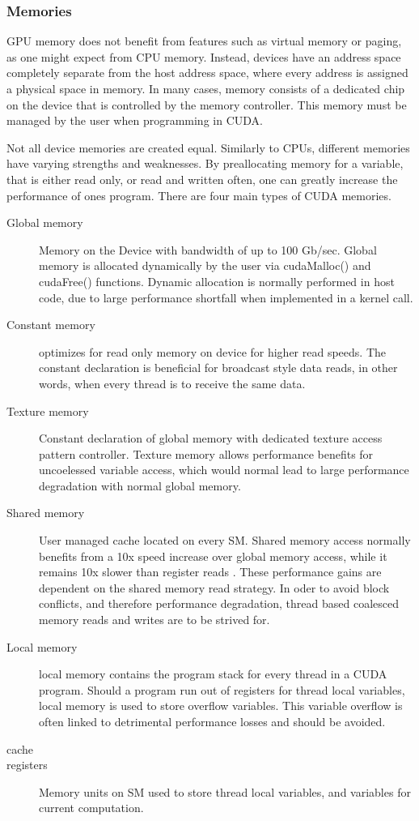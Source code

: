 \subsubsection{Memories}\label{sssec:memories}
GPU memory does not benefit from features such as virtual
memory or paging, as one might expect from CPU memory. Instead, devices have an
address space completely separate from the host address space, where every address is assigned a physical space in memory.
In many cases, memory consists of a dedicated chip on the device that is controlled
by the memory controller.  This memory must be managed by the user when programming in CUDA.
\par
Not all device memories are created equal.  Similarly to \Glspl{CPU},
different memories have varying strengths and weaknesses.  By preallocating memory for a variable,
that is either read only, or read and written often, one can greatly increase the
performance of ones program\cite{Wilt}.   %
There are four main types of CUDA memories.
\begin{description}
  \item [Global memory] Memory on the Device with bandwidth of up to 100 Gb/sec.
  Global memory is allocated dynamically by the user via cudaMalloc() and cudaFree() functions.
  Dynamic allocation is normally performed in host code, due to large performance shortfall
  when implemented in a kernel call.
  \item [Constant memory] optimizes for read only memory on device for higher
  read speeds.  The constant declaration is beneficial for broadcast style data
  reads, in other words, when every thread is to receive the same data.
  \item [Texture memory] Constant declaration of global memory with dedicated
   texture access pattern controller.  Texture memory allows performance benefits
   for uncoelessed variable access, which would normal lead to large performance
   degradation with normal global memory.
  \item [Shared memory] User managed cache located on every \Gls{SM}.  Shared memory access
  normally benefits from a 10x speed increase over global memory access, while it remains
  10x slower than register reads \cite{Wilt}.  These performance gains are dependent
  on the shared memory read strategy.  In oder to avoid block conflicts, and therefore
  performance degradation, thread based coalesced memory reads and writes are to
  be strived for.
  \item [Local memory] local memory contains the program stack for every thread
  in a CUDA program. Should a program run out of registers for thread local variables,
  local memory is  used to store overflow variables. This variable overflow is often
  linked to detrimental performance losses and should be avoided.\cite{Wilt}
  \item [cache]
  \item [registers] Memory units on \Gls{SM} used to store thread local variables,
                    and variables for current computation.
\end{description}

